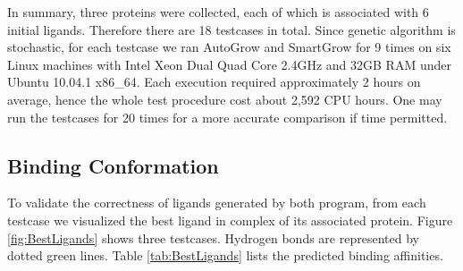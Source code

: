 In summary, three proteins were collected, each of which is associated with 6 initial ligands. Therefore there are 18 testcases in total. Since genetic algorithm is stochastic, for each testcase we ran AutoGrow and SmartGrow for 9 times on six Linux machines with Intel Xeon Dual Quad Core 2.4GHz and 32GB RAM under Ubuntu 10.04.1 x86\_64. Each execution required approximately 2 hours on average, hence the whole test procedure cost about 2,592 CPU hours. One may run the testcases for 20 times for a more accurate comparison if time permitted.

\subsection{Binding Conformation}

To validate the correctness of ligands generated by both program, from each testcase we visualized the best ligand in complex of its associated protein. Figure \ref{fig:BestLigands} shows three testcases. Hydrogen bonds are represented by dotted green lines. Table \ref{tab:BestLigands} lists the predicted binding affinities.

